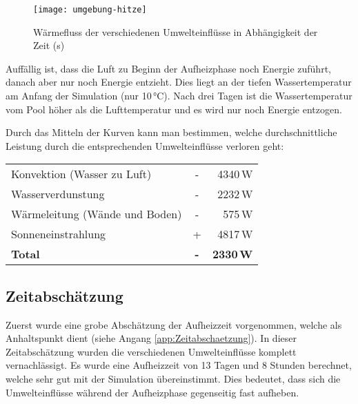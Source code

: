 \begin{figure}[H]
	\centering
	\texttt{[image: umgebung-hitze]}
	\caption{Wärmefluss der verschiedenen Umwelteinflüsse in Abhängigkeit der Zeit (s)}
	\label{fig:umgebung-hitze}
\end{figure}

Auffällig ist, dass die Luft zu Beginn der Aufheizphase noch Energie zuführt, danach aber nur noch Energie entzieht. Dies liegt an der tiefen Wassertemperatur am Anfang der Simulation (nur 10\,°C). Nach drei Tagen ist die Wassertemperatur vom Pool höher als die Lufttemperatur und es wird nur noch Energie entzogen.

Durch das Mitteln der Kurven kann man bestimmen, welche durchschnittliche Leistung durch die entsprechenden Umwelteinflüsse verloren geht:

\begin{table}[H]
	\centering
	\renewcommand{\arraystretch}{1.2}
	\begin{tabular}{L{6.5cm}cr}
		Konvektion (Wasser zu Luft)		& -			& 4340\,W				\\
		Wasserverdunstung 				& -			& 2232\,W				\\
		Wärmeleitung (Wände und Boden)	& -			& 575\,W				\\
		Sonneneinstrahlung				& +			& 4817\,W				\\ \hline
		\textbf{Total}    				& \textbf{-} 	& \textbf{2330\,W}
	\end{tabular}                                                           
\end{table}

\subsection{Zeitabschätzung}
\label{subsec:Zeitabschaetzung}
Zuerst wurde eine grobe Abschätzung der Aufheizzeit vorgenommen, welche als Anhaltspunkt dient (siehe Angang \ref{app:Zeitabschaetzung}). In dieser Zeitabschätzung wurden die verschiedenen Umwelteinflüsse komplett vernachlässigt. Es wurde eine Aufheizzeit von 13 Tagen und 8 Stunden berechnet, welche sehr gut mit der Simulation übereinstimmt. Dies bedeutet, dass sich die Umwelteinflüsse während der Aufheizphase gegenseitig fast aufheben.
